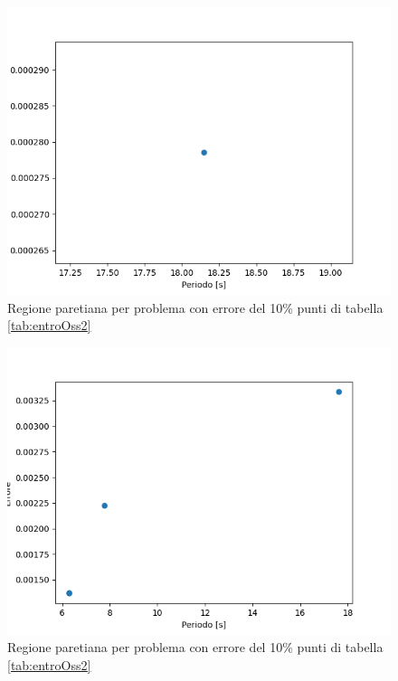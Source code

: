 \documentclass[a4paper,12pt]{report}
\begin{document}
\begin{itemize}
      \begin{figure}[H]
        \centering
        \includegraphics[scale=0.70]{img/entroOss/puls03/err5.png}
        \caption{Regione paretiana per problema con errore del 10\% punti di tabella \ref{tab:entroOss2}}
        \label{fig:entroOss_03_std_5err}
      \end{figure}

      \begin{figure}[H]
        \centering
        \includegraphics[scale=0.70]{img/entroOss/puls03/err10.png}
        \caption{Regione paretiana per problema con errore del 10\% punti di tabella \ref{tab:entroOss2}}
        \label{fig:entroOss_03_std_10err}
      \end{figure}


\end{itemize}
\end{document}
